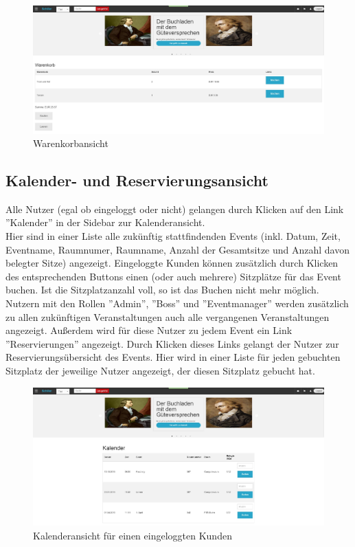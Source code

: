 \documentclass[a4paper]{article}
\begin{document}
\begin{figure}[ht]
\centering
\includegraphics[width=1.0\textwidth]{Warenkorb.jpg}
\caption{Warenkorbansicht}
\end{figure}
\smallskip

\FloatBarrier

\subsection{Kalender- und Reservierungsansicht}

Alle Nutzer (egal ob eingeloggt oder nicht) gelangen durch Klicken auf den Link ''Kalender'' in der Sidebar zur Kalenderansicht. \\
Hier sind in einer Liste alle zukünftig stattfindenden Events (inkl. Datum, Zeit, Eventname, Raumnumer, Raumname, Anzahl der Gesamtsitze und Anzahl davon belegter Sitze) angezeigt. Eingeloggte Kunden können zusätzlich durch Klicken des entsprechenden Buttons einen (oder auch mehrere) Sitzplätze für das Event buchen. Ist die Sitzplatzanzahl voll, so ist das Buchen nicht mehr möglich. \\
Nutzern mit den Rollen ''Admin'', ''Boss'' und ''Eventmanager'' werden zusätzlich zu allen zukünftigen Veranstaltungen auch alle vergangenen Veranstaltungen angezeigt. Außerdem wird für diese Nutzer zu jedem Event ein Link ''Reservierungen'' angezeigt. Durch Klicken dieses Links gelangt der Nutzer zur Reservierungsübersicht des Events. Hier wird in einer Liste für jeden gebuchten Sitzplatz der jeweilige Nutzer angezeigt, der diesen Sitzplatz gebucht hat.

\begin{figure}[ht]
\centering
\includegraphics[width=1.0\textwidth]{Kalender1.jpg}
\caption{Kalenderansicht für einen eingeloggten Kunden}
\end{figure}
\smallskip
\end{document}
